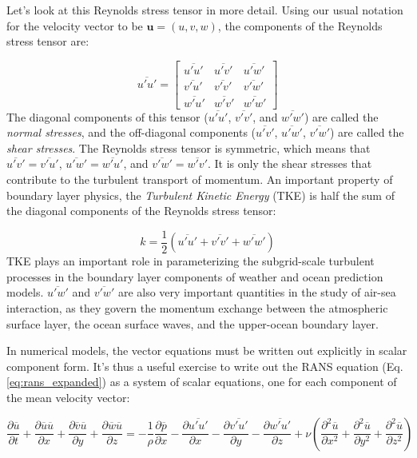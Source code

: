 \documentclass[12pt]{article}
\numberwithin{equation}{section}
\numberwithin{figure}{section}
\numberwithin{table}{section}
\begin{document}
Let's look at this Reynolds stress tensor in more detail.
Using our usual notation for the velocity vector to be $\mathbf{u} = (u, v, w)$,
the components of the Reynolds stress tensor are:

\begin{equation}
  \overline{u'u'} = \begin{bmatrix}
    \overline{u'u'} & \overline{u'v'} & \overline{u'w'} \\
    \overline{v'u'} & \overline{v'v'} & \overline{v'w'} \\
    \overline{w'u'} & \overline{w'v'} & \overline{w'w'}
  \end{bmatrix}
\end{equation}
The diagonal components of this tensor ($\overline{u'u'}$, $\overline{v'v'}$, and
$\overline{w'w'}$) are called the \textit{normal stresses}, and the off-diagonal
components ($\overline{u'v'}$, $\overline{u'w'}$, $\overline{v'w'}$) are called
the \textit{shear stresses}.
The Reynolds stress tensor is symmetric, which means that
$\overline{u'v'} = \overline{v'u'}$, $\overline{u'w'} = \overline{w'u'}$, and
$\overline{v'w'} = \overline{w'v'}$.
It is only the shear stresses that contribute to the turbulent transport of
momentum.
An important property of boundary layer physics, the
\textit{Turbulent Kinetic Energy} (TKE) is half
the sum of the diagonal components of the Reynolds stress tensor:

\begin{equation}
  k = \frac{1}{2} \left( \overline{u'u'} + \overline{v'v'} + \overline{w'w'} \right)
\end{equation}
TKE plays an important role in parameterizing the subgrid-scale turbulent
processes in the boundary layer components of weather and ocean prediction
models.
$\overline{u'w'}$ and $\overline{v'w'}$ are also very important quantities in
the study of air-sea interaction, as they govern the momentum exchange between
the atmospheric surface layer, the ocean surface waves, and the upper-ocean
boundary layer.

In numerical models, the vector equations must be written out explicitly in
scalar component form.
It's thus a useful exercise to write out the RANS equation
(Eq. \ref{eq:rans_expanded}) as a system of scalar equations, one for each
component of the mean velocity vector:

\begin{equation}
  \frac{\partial \overline{u}}{\partial t} + 
  \frac{\partial \overline{u} \overline{u}}{\partial x} +
  \frac{\partial \overline{v} \overline{u}}{\partial y} +
  \frac{\partial \overline{w} \overline{u}}{\partial z} =
  - \frac{1}{\rho} \frac{\partial \overline{p}}{\partial x}
  - \frac{\partial \overline{u'u'}}{\partial x} - \frac{\partial \overline{v'u'}}{\partial y} - \frac{\partial \overline{w'u'}}{\partial z}
  + \nu \left( \frac{\partial^2 \overline{u}}{\partial x^2} + 
               \frac{\partial^2 \overline{u}}{\partial y^2} +
               \frac{\partial^2 \overline{u}}{\partial z^2}
        \right)
\end{equation}
\end{document}
